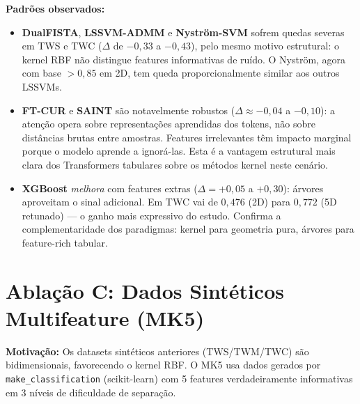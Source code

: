 \documentclass[12pt,a4paper]{article}
\begin{document}
\textbf{Padrões observados:}
\begin{itemize}
  \item \textbf{DualFISTA}, \textbf{LSSVM-ADMM} e \textbf{Nyström-SVM} sofrem
        quedas severas em TWS e TWC ($\Delta$ de $-0{,}33$ a $-0{,}43$), pelo
        mesmo motivo estrutural: o kernel RBF não distingue features informativas
        de ruído. O Nyström, agora com base $> 0{,}85$ em 2D, tem queda
        proporcionalmente similar aos outros LSSVMs.
  \item \textbf{FT-CUR} e \textbf{SAINT} são notavelmente robustos
        ($\Delta \approx -0{,}04$ a $-0{,}10$): a atenção opera sobre representações
        aprendidas dos tokens, não sobre distâncias brutas entre amostras. Features
        irrelevantes têm impacto marginal porque o modelo aprende a ignorá-las.
        Esta é a vantagem estrutural mais clara dos Transformers tabulares sobre
        os métodos kernel neste cenário.
  \item \textbf{XGBoost} \emph{melhora} com features extras
        ($\Delta = +0{,}05$ a $+0{,}30$): árvores aproveitam o sinal adicional.
        Em TWC vai de $0{,}476$ (2D) para $0{,}772$ (5D retunado) --- o ganho
        mais expressivo do estudo. Confirma a complementaridade dos paradigmas:
        kernel para geometria pura, árvores para feature-rich tabular.
\end{itemize}

\section{Ablação C: Dados Sintéticos Multifeature (MK5)}
\label{sec:mk5}

\textbf{Motivação:} Os datasets sintéticos anteriores (TWS/TWM/TWC) são
bidimensionais, favorecendo o kernel RBF. O MK5 usa dados gerados por
\texttt{make\_classification} (scikit-learn) com 5 features verdadeiramente
informativas em 3 níveis de dificuldade de separação.
\end{document}
